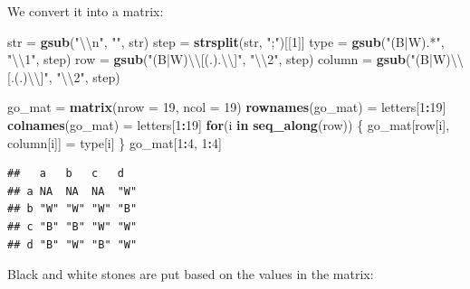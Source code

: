 \documentclass[]{book}
\newenvironment{Shaded}{\begin{snugshade}}{\end{snugshade}}
\newcommand{\KeywordTok}[1]{\textcolor[rgb]{0.13,0.29,0.53}{\textbf{#1}}}
\newcommand{\DataTypeTok}[1]{\textcolor[rgb]{0.13,0.29,0.53}{#1}}
\newcommand{\DecValTok}[1]{\textcolor[rgb]{0.00,0.00,0.81}{#1}}
\newcommand{\CharTok}[1]{\textcolor[rgb]{0.31,0.60,0.02}{#1}}
\newcommand{\StringTok}[1]{\textcolor[rgb]{0.31,0.60,0.02}{#1}}
\newcommand{\ControlFlowTok}[1]{\textcolor[rgb]{0.13,0.29,0.53}{\textbf{#1}}}
\newcommand{\OperatorTok}[1]{\textcolor[rgb]{0.81,0.36,0.00}{\textbf{#1}}}
\newcommand{\NormalTok}[1]{#1}
\theoremstyle{definition}
\theoremstyle{definition}
\theoremstyle{definition}
\theoremstyle{remark}
\begin{document}
We convert it into a matrix:

\begin{Shaded}
\begin{Highlighting}[]
\NormalTok{str =}\StringTok{ }\KeywordTok{gsub}\NormalTok{(}\StringTok{"}\CharTok{\textbackslash{}\textbackslash{}}\StringTok{n"}\NormalTok{, }\StringTok{""}\NormalTok{, str)}
\NormalTok{step =}\StringTok{ }\KeywordTok{strsplit}\NormalTok{(str, }\StringTok{";"}\NormalTok{)[[}\DecValTok{1}\NormalTok{]]}
\NormalTok{type =}\StringTok{ }\KeywordTok{gsub}\NormalTok{(}\StringTok{"(B|W).*"}\NormalTok{, }\StringTok{"}\CharTok{\textbackslash{}\textbackslash{}}\StringTok{1"}\NormalTok{, step)}
\NormalTok{row =}\StringTok{ }\KeywordTok{gsub}\NormalTok{(}\StringTok{"(B|W)}\CharTok{\textbackslash{}\textbackslash{}}\StringTok{[(.).}\CharTok{\textbackslash{}\textbackslash{}}\StringTok{]"}\NormalTok{, }\StringTok{"}\CharTok{\textbackslash{}\textbackslash{}}\StringTok{2"}\NormalTok{, step)}
\NormalTok{column =}\StringTok{ }\KeywordTok{gsub}\NormalTok{(}\StringTok{"(B|W)}\CharTok{\textbackslash{}\textbackslash{}}\StringTok{[.(.)}\CharTok{\textbackslash{}\textbackslash{}}\StringTok{]"}\NormalTok{, }\StringTok{"}\CharTok{\textbackslash{}\textbackslash{}}\StringTok{2"}\NormalTok{, step)}

\NormalTok{go_mat =}\StringTok{ }\KeywordTok{matrix}\NormalTok{(}\DataTypeTok{nrow =} \DecValTok{19}\NormalTok{, }\DataTypeTok{ncol =} \DecValTok{19}\NormalTok{)}
\KeywordTok{rownames}\NormalTok{(go_mat) =}\StringTok{ }\NormalTok{letters[}\DecValTok{1}\OperatorTok{:}\DecValTok{19}\NormalTok{]}
\KeywordTok{colnames}\NormalTok{(go_mat) =}\StringTok{ }\NormalTok{letters[}\DecValTok{1}\OperatorTok{:}\DecValTok{19}\NormalTok{]}
\ControlFlowTok{for}\NormalTok{(i }\ControlFlowTok{in} \KeywordTok{seq_along}\NormalTok{(row)) \{}
\NormalTok{    go_mat[row[i], column[i]] =}\StringTok{ }\NormalTok{type[i]}
\NormalTok{\}}
\NormalTok{go_mat[}\DecValTok{1}\OperatorTok{:}\DecValTok{4}\NormalTok{, }\DecValTok{1}\OperatorTok{:}\DecValTok{4}\NormalTok{]}
\end{Highlighting}
\end{Shaded}

\begin{verbatim}
##   a   b   c   d  
## a NA  NA  NA  "W"
## b "W" "W" "W" "B"
## c "B" "B" "W" "W"
## d "B" "W" "B" "W"
\end{verbatim}

Black and white stones are put based on the values in the matrix:
\end{document}
